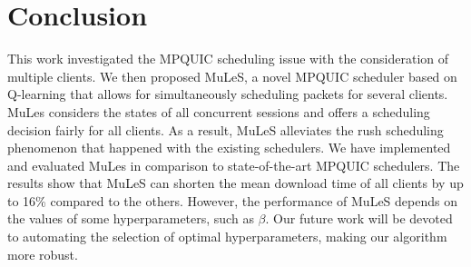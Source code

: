 \section{Conclusion}
\label{sec:conclusion}


This work investigated the MPQUIC scheduling issue with the consideration of multiple clients. We then proposed MuLeS, a novel MPQUIC scheduler based on Q-learning that allows for simultaneously scheduling packets for several clients. MuLes considers the states of all concurrent sessions and offers a scheduling decision fairly for all clients. As a result, MuLeS alleviates the rush scheduling phenomenon that happened with the existing schedulers. We have implemented and evaluated MuLes in comparison to state-of-the-art MPQUIC schedulers. The results show that  MuLeS can shorten the mean download time of all clients by up to 16\% compared to the others. However, the performance of MuLeS depends on the values of some hyperparameters, such as $\beta$. Our future work will be devoted to automating the selection of optimal hyperparameters, making our algorithm more robust.
